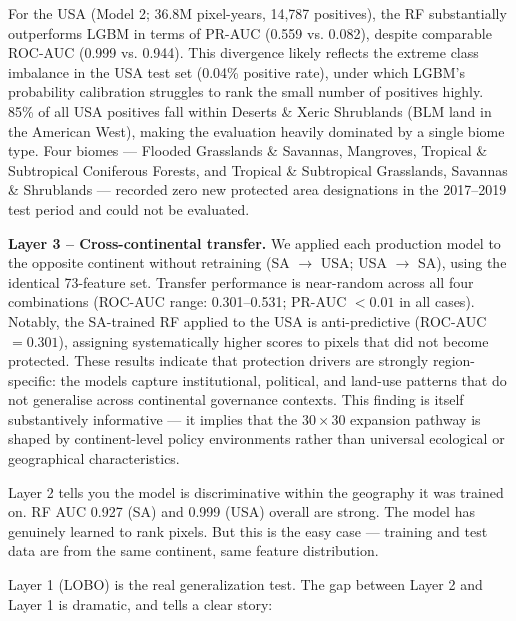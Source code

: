 \documentclass[12pt]{article}
\theoremstyle{break} %
\begin{document}
\medskip

\noindent For the USA (Model 2; 36.8M pixel-years, 14,787 positives), the RF substantially outperforms LGBM in terms of PR-AUC (0.559 vs. 0.082), despite comparable ROC-AUC (0.999 vs. 0.944). This divergence likely reflects the extreme class imbalance in the USA test set (0.04\% positive rate), under which LGBM's probability calibration struggles to rank the small number of positives highly. 85\% of all USA positives fall within Deserts \& Xeric Shrublands (BLM land in the American West), making the evaluation heavily dominated by a single biome type. Four biomes --- Flooded Grasslands \& Savannas, Mangroves, Tropical \& Subtropical Coniferous Forests, and Tropical \& Subtropical Grasslands, Savannas \& Shrublands --- recorded zero new protected area designations in the 2017--2019 test period and could not be evaluated.

\medskip

\noindent \textbf{Layer 3 -- Cross-continental transfer.} We applied each production model to the opposite continent without retraining (SA $\rightarrow$ USA; USA $\rightarrow$ SA), using the identical 73-feature set. Transfer performance is near-random across all four combinations (ROC-AUC range: 0.301--0.531; PR-AUC $< 0.01$ in all cases). Notably, the SA-trained RF applied to the USA is anti-predictive (ROC-AUC $= 0.301$), assigning systematically higher scores to pixels that did not become protected. These results indicate that protection drivers are strongly region-specific: the models capture institutional, political, and land-use patterns that do not generalise across continental governance contexts. This finding is itself substantively informative --- it implies that the $30 \times 30$ expansion pathway is shaped by continent-level policy environments rather than universal ecological or geographical characteristics.

\vspace{1em}

Layer 2 tells you the model is discriminative within the geography it was trained on. RF AUC 0.927 (SA) and 0.999 (USA) overall are strong. The model has genuinely learned to rank pixels. But this is the easy case --- training and test data are from the same continent, same feature distribution.

\vspace{1em}

Layer 1 (LOBO) is the real generalization test. The gap between Layer 2 and Layer 1 is dramatic, and tells a clear story:
\end{document}

